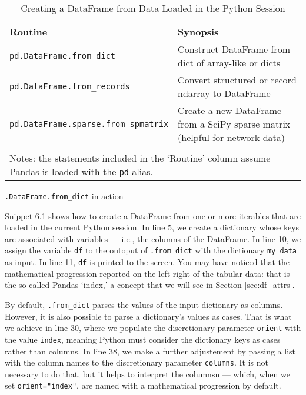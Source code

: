 \documentclass[a4paper,11pt]{book}
\numberwithin{figure}{chapter}
\numberwithin{table}{chapter}
\newcommand{\question}[1]{%
    \begin{tcolorbox}[colback=comp_c!10,colframe=comp_c,sidebyside align=top,width=\linewidth,before skip=1ex]
        #1
    \end{tcolorbox}
    \switchcolumn%
}
\newcommand{\note}[1]{%
    \begin{tcolorbox}[colback=white!0,colframe=white!10,width=\linewidth,before skip=1ex]
        #1
    \end{tcolorbox}
}
\begin{document}
\begin{sidewaystable}[!htbp]
	\centering
	\caption{Creating a DataFrame from Data Loaded in the Python Session}
	\label{tab:read_methods}
	\begin{tabular}{ll}
		\toprule \toprule 
		Routine & Synopsis \\
		\midrule 
		\texttt{pd.DataFrame.from\_dict} & Construct DataFrame from dict of array-like or dicts\\ 
		\texttt{pd.DataFrame.from\_records} & Convert structured or record ndarray to DataFrame\\
		\texttt{pd.DataFrame.sparse.from\_spmatrix} & Create a new DataFrame from a SciPy sparse matrix (helpful for network data)\\ 
		\bottomrule \\[-1.8ex]
		\multicolumn{2}{l}{Notes: the statements included in the `Routine' column assume Pandas is loaded with the \texttt{pd} alias.} \\
	\end{tabular}
\end{sidewaystable}

\clearpage

\begin{paracol}{2}
	\question{\raggedright \texttt{.DataFrame.from\_dict} in action}
	\note{Snippet 6.1 shows how to create a DataFrame from one or more iterables that are loaded in the current Python session. In line 5, we create a dictionary whose keys are associated with variables --- i.e., the columns of the DataFrame. In line 10, we assign the variable \texttt{df} to the outoput of \texttt{.from\_dict} with the dictionary \texttt{my\_data} as input. In line 11, \texttt{df} is printed to the screen. You may have noticed that the mathematical progression reported on the left-right of the tabular data: that is the so-called Pandas `index,' a concept that we will see in Section \ref{sec:df_attrs}.
	
	\quad By default, \texttt{.from\_dict} parses the values of the input dictionary as columns. However, it is also possible to parse a dictionary's values as cases. That is what we achieve in line 30, where we populate the discretionary parameter \texttt{orient} with the value \texttt{index}, meaning Python must consider the dictionary keys as cases rather than columns. In line 38, we make a further adjustement by passing a list with the column names to the discretionary parameter \texttt{columns}. It is not necessary to do that, but it helps to interpret the columnsn --- which, when we set \texttt{orient="index"}, are named with a mathematical progression by default.}
\end{paracol}
\end{document}
